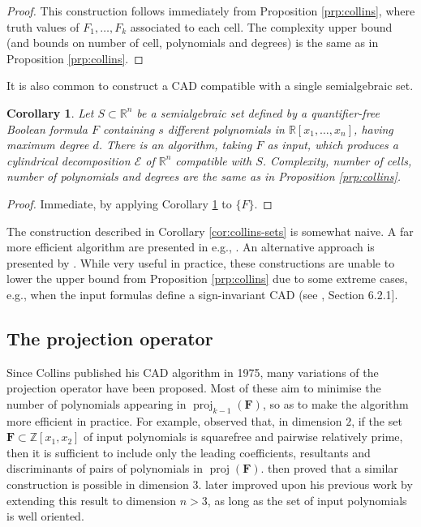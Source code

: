 \documentclass[
]{book}
\newtheorem{corollary}{Corollary}[chapter]
\theoremstyle{definition}
\theoremstyle{definition}
\theoremstyle{definition}
\theoremstyle{definition}
\theoremstyle{remark}
\begin{document}
\begin{proof}
This construction follows immediately from Proposition \ref{prp:collins}, where truth values of \(F_1,\ldots,F_k\) associated to each cell.
The complexity upper bound (and bounds on number of cell, polynomials and degrees) is the same as in Proposition \ref{prp:collins}.
\end{proof}

It is also common to construct a CAD compatible with a single semialgebraic set.

\begin{corollary}
\protect\hypertarget{cor:collins-set}{}\label{cor:collins-set}Let \(S\subset \mathbb{R}^n\) be a semialgebraic set defined by a quantifier-free Boolean formula \(F\) containing \(s\) different polynomials in \(\mathbb{R}[x_1,\ldots,x_n]\), having maximum degree \(d\).
There is an algorithm, taking \(F\) as input, which produces a cylindrical decomposition \(\mathcal E\) of \(\mathbb{R}^n\) compatible with \(S\).
Complexity, number of cells, number of polynomials and degrees are the same as in Proposition \ref{prp:collins}.
\end{corollary}

\begin{proof}
Immediate, by applying Corollary \ref{cor:collins-set} to \(\{ F \}\).
\end{proof}

The construction described in Corollary \ref{cor:collins-sets} is somewhat naive.
A far more efficient algorithm are presented in e.g., \citet{collins1991}. An alternative approach is presented by \citet{bradford2014}.
While very useful in practice, these constructions are unable to lower the upper bound from Proposition \ref{prp:collins} due to some extreme cases, e.g., when the input formulas define a sign-invariant CAD (see \citet{bradford2014}, Section 6.2.1{]}.

\hypertarget{the-projection-operator}{%
\subsection{The projection operator}\label{the-projection-operator}}

Since Collins published his CAD algorithm in 1975, many variations of the projection operator have been proposed. Most of these aim to minimise the number of polynomials appearing in \(\operatorname{proj}_{k-1}(\mathbf{F})\), so as to make the algorithm more efficient in practice.
For example, \citet{collins1975} observed that, in dimension \(2\), if the set \(\mathbf{F} \subset \mathbb{Z}[x_1,x_2]\) of input polynomials is
squarefree and pairwise relatively prime, then it is sufficient to include only the leading
coefficients, resultants and discriminants of pairs of polynomials in \(\operatorname{proj}(\mathbf{F})\). \citet{mccallum1988} then proved that a
similar construction is possible in dimension \(3\).
\citet{mccallum1998} later improved upon his previous work by extending this result to dimension \(n > 3\), as long as the set of input polynomials is well oriented.
\end{document}
